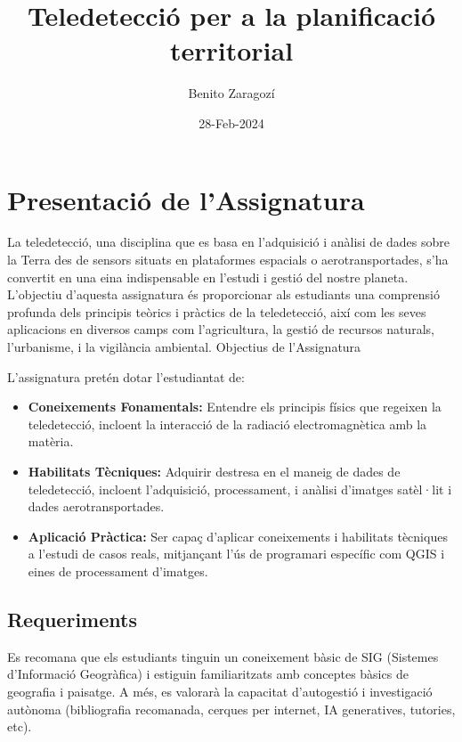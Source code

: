\documentclass[
]{book}
\title{Teledetecció per a la planificació territorial}
\author{Benito Zaragozí}
\date{28-Feb-2024}
\providecommand{\tightlist}{%
  \setlength{\itemsep}{0pt}\setlength{\parskip}{0pt}}
\begin{document}
\maketitle

{
\setcounter{tocdepth}{1}
\tableofcontents
}
\hypertarget{presentaciuxf3-de-lassignatura}{%
\chapter*{Presentació de l'Assignatura}\label{presentaciuxf3-de-lassignatura}}

La teledetecció, una disciplina que es basa en l'adquisició i anàlisi de dades sobre la Terra des de sensors situats en plataformes espacials o aerotransportades, s'ha convertit en una eina indispensable en l'estudi i gestió del nostre planeta. L'objectiu d'aquesta assignatura és proporcionar als estudiants una comprensió profunda dels principis teòrics i pràctics de la teledetecció, així com les seves aplicacions en diversos camps com l'agricultura, la gestió de recursos naturals, l'urbanisme, i la vigilància ambiental.
Objectius de l'Assignatura

L'assignatura pretén dotar l'estudiantat de:

\begin{itemize}
\tightlist
\item
  \textbf{Coneixements Fonamentals:} Entendre els principis físics que regeixen la teledetecció, incloent la interacció de la radiació electromagnètica amb la matèria.
\item
  \textbf{Habilitats Tècniques:} Adquirir destresa en el maneig de dades de teledetecció, incloent l'adquisició, processament, i anàlisi d'imatges satèl·lit i dades aerotransportades.
\item
  \textbf{Aplicació Pràctica:} Ser capaç d'aplicar coneixements i habilitats tècniques a l'estudi de casos reals, mitjançant l'ús de programari específic com QGIS i eines de processament d'imatges.
\end{itemize}

\hypertarget{requeriments}{%
\section*{Requeriments}\label{requeriments}}

Es recomana que els estudiants tinguin un coneixement bàsic de SIG (Sistemes d'Informació Geogràfica) i estiguin familiaritzats amb conceptes bàsics de geografia i paisatge. A més, es valorarà la capacitat d'autogestió i investigació autònoma (bibliografia recomanada, cerques per internet, IA generatives, tutories, etc).
\end{document}
